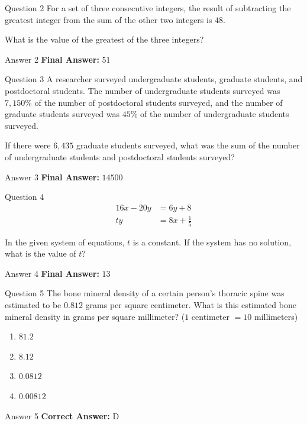 \documentclass{beamer}
\begin{document}
\begin{frame}{Question 2}
\small
For a set of three consecutive integers, the result of subtracting the greatest integer from the sum of the other two integers is \(48\).

What is the value of the greatest of the three integers?
\end{frame}
\begin{frame}{Answer 2}
\small
\textbf{Final Answer:} $\boxed{51}$
\end{frame}

\begin{frame}{Question 3}
\small
A researcher surveyed undergraduate students, graduate students, and postdoctoral students. The number of undergraduate students surveyed was \(7{,}150\%\) of the number of postdoctoral students surveyed, and the number of graduate students surveyed was \(45\%\) of the number of undergraduate students surveyed.

If there were \(6{,}435\) graduate students surveyed, what was the sum of the number of undergraduate students and postdoctoral students surveyed?
\end{frame}
\begin{frame}{Answer 3}
\small
\textbf{Final Answer:} $\boxed{14500}$
\end{frame}

\begin{frame}{Question 4}
\small
\[
\begin{aligned}
16x - 20y &= 6y + 8 \\
ty &= 8x + \frac{1}{5}
\end{aligned}
\]

In the given system of equations, \(t\) is a constant. If the system has no solution, what is the value of \(t\)?
\end{frame}
\begin{frame}{Answer 4}
\small
\textbf{Final Answer:} $\boxed{13}$
\end{frame}

\begin{frame}{Question 5}
\small
The bone mineral density of a certain person's thoracic spine was estimated to be \(0.812\) grams per square centimeter. What is this estimated bone mineral density in grams per square millimeter? (\(1\) centimeter \(= 10\) millimeters)
\vspace{0.35cm}
\begin{enumerate}
    \item[A.] \(81.2\)
    \item[B.] \(8.12\)
    \item[C.] \(0.0812\)
    \item[D.] \(0.00812\)
\end{enumerate}
\end{frame}
\begin{frame}{Answer 5}
\small
\textbf{Correct Answer:} D
\end{frame}
\end{document}
